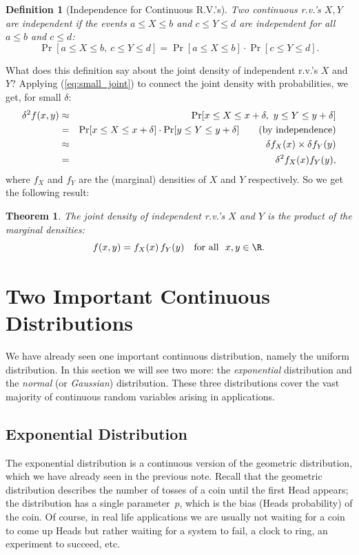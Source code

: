 \documentclass[11pt]{article}
\newcounter{thm}
\newtheorem{theorem}{Theorem}[thm]
\newtheorem{definition}{Definition}[thm]
\begin{document}
\begin{definition}[Independence for Continuous R.V.'s]
Two continuous r.v.'s $X,Y$ are {\it independent\/} if the events
$a\le X\le b$ and $c\le Y\le d$ are independent for all $a \le b$ and $c \le d$:
$$\Pr[a \le X \le b, ~ c \le Y \le d] = \Pr[a \le X \le b] \cdot \Pr[c \le Y \le d].$$
\end{definition}

What does this definition say about the joint density of independent
r.v.'s $X$ and $Y$? Applying (\ref{eq:small_joint}) to connect the
joint density with probabilities, we get, for small $\delta$:
\begin{eqnarray*}
\delta^2 f(x,y) & \approx & \Pr[x\le X\le x+\delta, ~ y \le Y \le y
+\delta]\\
& = & \Pr[x\le X\le x+\delta]  \cdot \Pr[y \le Y \le y
+\delta]\qquad\hbox{\rm (by independence)}\\
& \approx & \delta f_X(x) \times \delta f_Y(y) \\
&=& \delta^2 f_X(x) f_Y(y),
\end{eqnarray*}
where $f_X$ and $f_Y$ are the (marginal) densities of $X$ and $Y$
respectively. So we get the following result:

\begin{theorem}\label{Thm:JointDensity}
The joint density of independent r.v.'s $X$ and $Y$ is the product of the marginal densities:
$$f(x,y) = f_X(x) \, f_Y(y) ~~ \text{ for all } ~ x,y \in \R.$$
\end{theorem}



\section*{Two Important Continuous Distributions}

We have already seen one important continuous distribution, namely the uniform distribution.
In this section we will see two more: the {\it exponential\/} distribution and the {\it normal\/}
(or {\it Gaussian\/}) distribution.  These three distributions cover the vast majority of continuous
random variables arising in applications.

\subsection*{Exponential Distribution}

The exponential distribution is a continuous version of the
geometric distribution, which we have already seen in the previous note.  Recall that the geometric distribution
describes the number of tosses of a coin until the first Head appears; the distribution has
a single parameter~$p$, which is the bias (Heads probability) of the coin.  Of course, in
real life applications we are usually not waiting for a coin to come up Heads but rather
waiting for a system to fail, a clock to ring, an experiment to succeed, etc.
\end{document}
